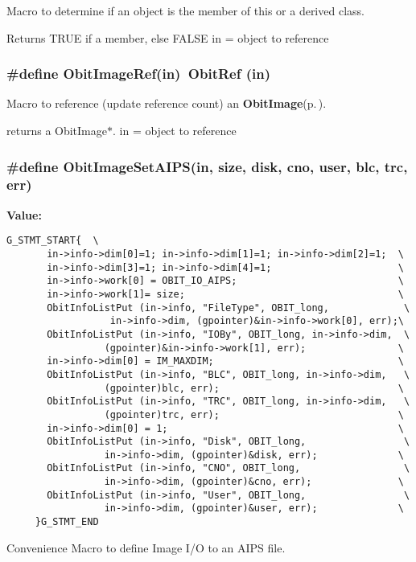 Macro to determine if an object is the member of this or a derived class. 

Returns TRUE if a member, else FALSE in = object to reference 
\subsubsection{\setlength{\rightskip}{0pt plus 5cm}\#define Obit\-Image\-Ref(in)\ Obit\-Ref (in)}\label{ObitImage_8h_a1}


Macro to reference (update reference count) an {\bf Obit\-Image}{\rm (p.\,\pageref{structObitImage})}. 

returns a Obit\-Image$\ast$. in = object to reference 
\subsubsection{\setlength{\rightskip}{0pt plus 5cm}\#define Obit\-Image\-Set\-AIPS(in, size, disk, cno, user, blc, trc, err)}\label{ObitImage_8h_a4}


{\bf Value:}

\footnotesize\begin{verbatim}G_STMT_START{  \
       in->info->dim[0]=1; in->info->dim[1]=1; in->info->dim[2]=1;  \
       in->info->dim[3]=1; in->info->dim[4]=1;                      \
       in->info->work[0] = OBIT_IO_AIPS;                            \
       in->info->work[1]= size;                                     \
       ObitInfoListPut (in->info, "FileType", OBIT_long,             \
                  in->info->dim, (gpointer)&in->info->work[0], err);\
       ObitInfoListPut (in->info, "IOBy", OBIT_long, in->info->dim,  \
                 (gpointer)&in->info->work[1], err);                \
       in->info->dim[0] = IM_MAXDIM;                                \
       ObitInfoListPut (in->info, "BLC", OBIT_long, in->info->dim,   \
                 (gpointer)blc, err);                               \
       ObitInfoListPut (in->info, "TRC", OBIT_long, in->info->dim,   \
                 (gpointer)trc, err);                               \
       in->info->dim[0] = 1;                                        \
       ObitInfoListPut (in->info, "Disk", OBIT_long,                 \
                 in->info->dim, (gpointer)&disk, err);              \
       ObitInfoListPut (in->info, "CNO", OBIT_long,                  \
                 in->info->dim, (gpointer)&cno, err);               \
       ObitInfoListPut (in->info, "User", OBIT_long,                 \
                 in->info->dim, (gpointer)&user, err);              \
     }G_STMT_END
\end{verbatim}\normalsize 
Convenience Macro to define Image I/O to an AIPS file. 

